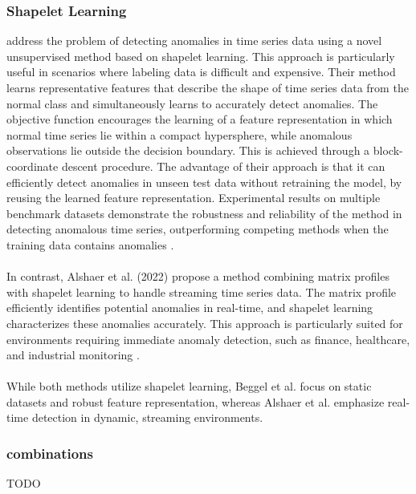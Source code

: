 \subsubsection{Shapelet Learning}
 address the problem of detecting anomalies in time series data using a novel unsupervised method based on shapelet learning. This approach is particularly useful in scenarios where labeling data is difficult and expensive.
Their method learns representative features that describe the shape of time series data from the normal class and simultaneously learns to accurately detect anomalies. The objective function encourages the learning of a feature representation in which normal time series lie within a compact hypersphere, while anomalous observations lie outside the decision boundary. This is achieved through a block-coordinate descent procedure.
The advantage of their approach is that it can efficiently detect anomalies in unseen test data without retraining the model, by reusing the learned feature representation. Experimental results on multiple benchmark datasets demonstrate the robustness and reliability of the method in detecting anomalous time series, outperforming competing methods when the training data contains anomalies \cite{beggel_time_2019}.\\\\
In contrast, Alshaer et al. (2022) propose a method combining matrix profiles with shapelet learning to handle streaming time series data. The matrix profile efficiently identifies potential anomalies in real-time, and shapelet learning characterizes these anomalies accurately. This approach is particularly suited for environments requiring immediate anomaly detection, such as finance, healthcare, and industrial monitoring \cite{alshaer_detecting_2020}.\\\\
While both methods utilize shapelet learning, Beggel et al. focus on static datasets and robust feature representation, whereas Alshaer et al. emphasize real-time detection in dynamic, streaming environments.
\subsubsection{combinations}
TODO
\cite{aota_zero-shot_2023} \\\\ %
\cite{li_zero-shot_2023} \\\\ %

